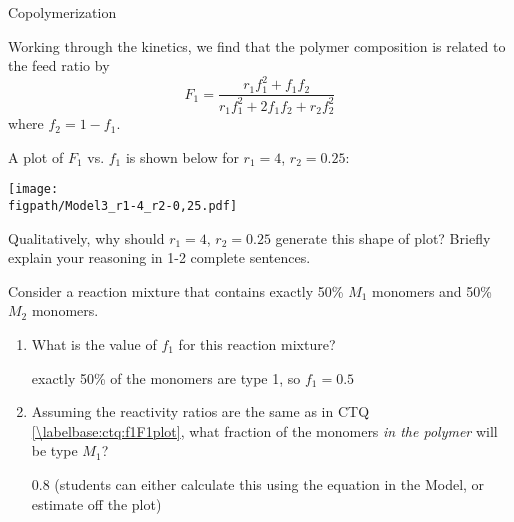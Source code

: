\begin{activity}{Copolymerization}
\begin{model}
	Working through the kinetics, we find that the polymer composition is related to the feed ratio by
	\begin{equation*}
		F_1 = \frac{r_1f_1^2 + f_1f_2}{r_1f_1^2+2f_1f_2 + r_2f_2^2}
	\end{equation*}
	where $f_2 = 1-f_1$.

\end{model}

\clearpage
\begin{ctqs}
	\question \label{\labelbase:ctq:f1F1plot} A plot of $F_1$ vs. $f_1$ is shown below for $r_1 = 4$, $r_2=0.25$: 
	
		\vspace{3pt}
		\centerline{\texttt{[image: \\figpath/Model3\_r1-4\_r2-0,25.pdf]}}
	
		Qualitatively, why should $r_1 = 4$, $r_2=0.25$ generate this shape of plot?  Briefly explain your reasoning in 1-2 complete sentences.
				
		\begin{solution}[1.5in]\end{solution}
		
	\question Consider a reaction mixture that contains exactly 50\% $M_1$ monomers and 50\% $M_2$ monomers.
	
		\begin{enumerate}
			\item What is the value of $f_1$ for this reaction mixture?
			
				\begin{solution}[0.5in]
					exactly 50\% of the monomers are type 1, so $f_1=0.5$
				\end{solution}
			
			\item Assuming the reactivity ratios are the same as in CTQ \ref{\labelbase:ctq:f1F1plot}, what fraction of the monomers \emph{in the polymer} will be type $M_1$?
			
				\begin{solution}[0.5in]
					0.8 (students can either calculate this using the equation in the Model, or estimate off the plot)
				\end{solution}
			

\end{enumerate}
\end{ctqs}
\end{activity}
